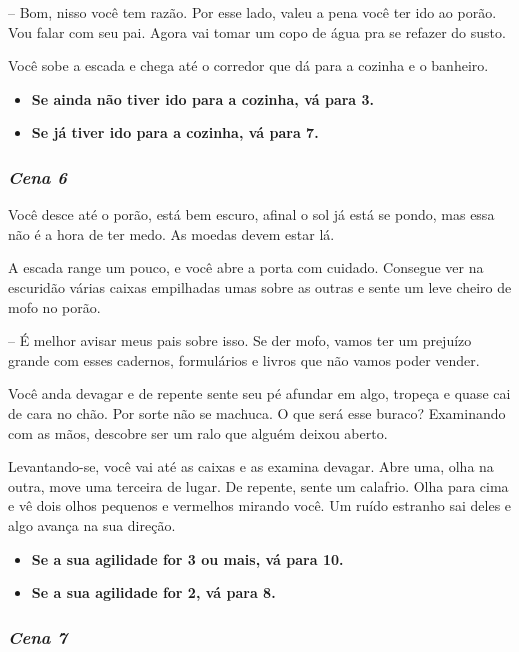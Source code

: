 -- Bom, nisso você tem razão. Por esse lado, valeu a pena você ter ido ao porão. Vou falar com seu pai. Agora vai tomar um copo de água pra se refazer do susto.

Você sobe a escada e chega até o corredor que dá para a cozinha e o banheiro.

\begin{itemize}
	\item \textbf{Se ainda não tiver ido para a cozinha, vá para 3.}
	\item \textbf{Se já tiver ido para a cozinha, vá para 7.}
\end{itemize}

\bigskip\medskip

\subsubsection*{\textit{\textbf{Cena 6}}}

Você desce até o porão, está bem escuro, afinal o sol já está se pondo, mas essa não é a hora de ter medo. As moedas devem estar lá.

A escada range um pouco, e você abre a porta com cuidado. Consegue ver na escuridão várias caixas empilhadas umas sobre as outras e sente um leve cheiro de mofo no porão.

-- É melhor avisar meus pais sobre isso. Se der mofo, vamos ter um prejuízo grande com esses cadernos, formulários e livros que não vamos poder vender.

Você anda devagar e de repente sente seu pé afundar em algo, tropeça e quase cai de cara no chão. Por sorte não se machuca. O que será esse buraco? Examinando com as mãos, descobre ser um ralo que alguém deixou aberto.

Levantando-se, você vai até as caixas e as examina devagar. Abre uma, olha na outra, move uma terceira de lugar. De repente, sente um calafrio. Olha para cima e vê dois olhos pequenos e vermelhos mirando você. Um ruído estranho sai deles e algo avança na sua direção.

\begin{itemize}
	\item \textbf{Se a sua agilidade for 3 ou mais, vá para 10.}
	\item \textbf{Se a sua agilidade for 2, vá para 8.}
\end{itemize}

\bigskip\medskip

\subsubsection*{\textit{\textbf{Cena 7}}}

